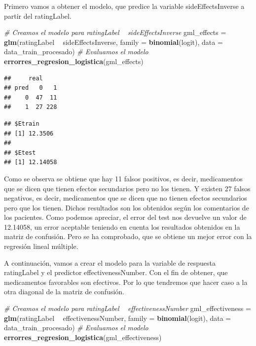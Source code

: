 \documentclass[spanish,]{article}
\newenvironment{Shaded}{\begin{snugshade}}{\end{snugshade}}
\newcommand{\KeywordTok}[1]{\textcolor[rgb]{0.13,0.29,0.53}{\textbf{#1}}}
\newcommand{\DataTypeTok}[1]{\textcolor[rgb]{0.13,0.29,0.53}{#1}}
\newcommand{\StringTok}[1]{\textcolor[rgb]{0.31,0.60,0.02}{#1}}
\newcommand{\CommentTok}[1]{\textcolor[rgb]{0.56,0.35,0.01}{\textit{#1}}}
\newcommand{\OperatorTok}[1]{\textcolor[rgb]{0.81,0.36,0.00}{\textbf{#1}}}
\newcommand{\NormalTok}[1]{#1}
\begin{document}
Primero vamos a obtener el modelo, que predice la variable
sideEffectsInverse a partir del ratingLabel.

\begin{Shaded}
\begin{Highlighting}[]
\CommentTok{# Creamos el modelo para ratingLabel ~ sideEffectsInverse}
\NormalTok{gml_effects =}\StringTok{ }\KeywordTok{glm}\NormalTok{(ratingLabel }\OperatorTok{~}\StringTok{ }\NormalTok{sideEffectsInverse, }\DataTypeTok{family =} \KeywordTok{binomial}\NormalTok{(logit), }
                  \DataTypeTok{data =}\NormalTok{ data_train_procesado)}
\CommentTok{# Evaluamos el modelo}
\KeywordTok{errorres_regresion_logistica}\NormalTok{(gml_effects)}
\end{Highlighting}
\end{Shaded}

\begin{verbatim}
##     real
## pred   0   1
##    0  47  11
##    1  27 228
\end{verbatim}

\begin{verbatim}
## $Etrain
## [1] 12.3506
## 
## $Etest
## [1] 12.14058
\end{verbatim}

Como se observa se obtiene que hay 11 falsos positivos, es decir,
medicamentos que se dicen que tienen efectos secundarios pero no los
tienen. Y existen 27 falsos negativos, es decir, medicamentos que se
dicen que no tienen efectos secundarios pero que los tienen. Dichos
resultados son los obtenidos según los comentarios de los pacientes.
Como podemos apreciar, el error del test nos devuelve un valor de
12.14058, un error aceptable teniendo en cuenta los resultados obtenidos
en la matriz de confusión. Pero se ha comprobado, que se obtiene un
mejor error con la regresión lineal múltiple.

A continuación, vamos a crear el modelo para la variable de respuesta
ratingLabel y el predictor effectivenessNumber. Con el fin de obtener,
que medicamentos favorables son efectivos. Por lo que tendremos que
hacer caso a la otra diagonal de la matriz de confusión.

\begin{Shaded}
\begin{Highlighting}[]
\CommentTok{# Creamos el modelo para ratingLabel ~ effectivenessNumber}
\NormalTok{gml_effectiveness =}\StringTok{ }\KeywordTok{glm}\NormalTok{(ratingLabel }\OperatorTok{~}\StringTok{ }\NormalTok{effectivenessNumber, }\DataTypeTok{family =} \KeywordTok{binomial}\NormalTok{(logit), }
                        \DataTypeTok{data =}\NormalTok{ data_train_procesado)}
\CommentTok{# Evaluamos el modelo}
\KeywordTok{errorres_regresion_logistica}\NormalTok{(gml_effectiveness)}
\end{Highlighting}
\end{Shaded}
\end{document}
